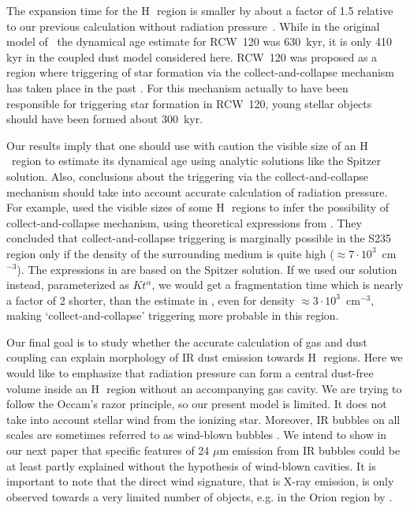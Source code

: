 \documentclass[a4paper,fleqn,usenatbib]{mnras}
\newcommand{\hii}    {H\,{\sc{ii}}~}
\begin{document}
The expansion time for the \hii region is smaller  by about a factor of 1.5 relative to our previous calculation without radiation pressure~. While in the original model of~ the dynamical age estimate for RCW~120 was 630~kyr, it is only 410 kyr in the coupled dust model considered here. RCW~120 was proposed as a region where triggering of star formation via the collect-and-collapse mechanism has taken place in the past \citep[e.g.][]{zavagno_07}. For this mechanism actually to have been responsible for triggering star formation in RCW~120, young stellar objects should have been formed about 300~kyr.

Our results imply that one should use with caution the visible size of an \hii region to estimate   its dynamical age using analytic solutions like the Spitzer solution. Also, conclusions about the triggering via the collect-and-collapse mechanism should take into account accurate calculation of radiation pressure. For example, \cite{Kirsanova_14} used the visible sizes of some \hii regions to infer the possibility of collect-and-collapse mechanism, using theoretical expressions from \citet{Whitworth_94}. They concluded that collect-and-collapse triggering is marginally possible in the S235 region only if the density of the surrounding medium is quite high ($\approx7\cdot10^3$~cm$^{-3}$). The expressions in \citet{Whitworth_94} are based on the Spitzer solution. If we used our solution instead, parameterized as $Kt^\alpha$, we would get a fragmentation time which is nearly a factor of 2 shorter, than the estimate in \cite{Kirsanova_14}, even for density $\approx3\cdot10^3$~cm$^{-3}$, making `collect-and-collapse' triggering more probable in this region.

Our final goal is to study whether the accurate calculation of gas and dust coupling can explain morphology of IR dust emission towards \hii regions. Here we would like to emphasize that radiation pressure can form a central dust-free volume inside an \hii region without an accompanying gas cavity. We are trying to follow the Occam's razor principle, so our present model is limited. It does not take into account stellar wind from the ionizing star. Moreover, IR bubbles on all scales are sometimes referred to as wind-blown bubbles \citep[see e.g.][]{churchwell_06}. We intend to show in our next paper that specific features of 24 $\mu$m emission from IR bubbles could be at least partly explained without the hypothesis of wind-blown cavities. It is important to note that the direct wind signature, that is X-ray emission, is only observed towards a very limited number of objects, e.g. in the Orion region by \citet{Gudel_08}.
\end{document}
